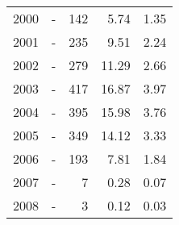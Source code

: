 \begin{longtable}{lXrrr}
        2000 & \multicolumn{1}{X}{-} & %
          \num{142} &
          \num[round-mode=places,round-precision=2]{5,74} &
          \num[round-mode=places,round-precision=2]{1,35} \\

        2001 & \multicolumn{1}{X}{-} & %
          \num{235} &
          \num[round-mode=places,round-precision=2]{9,51} &
          \num[round-mode=places,round-precision=2]{2,24} \\

        2002 & \multicolumn{1}{X}{-} & %
          \num{279} &
          \num[round-mode=places,round-precision=2]{11,29} &
          \num[round-mode=places,round-precision=2]{2,66} \\

        2003 & \multicolumn{1}{X}{-} & %
          \num{417} &
          \num[round-mode=places,round-precision=2]{16,87} &
          \num[round-mode=places,round-precision=2]{3,97} \\

        2004 & \multicolumn{1}{X}{-} & %
          \num{395} &
          \num[round-mode=places,round-precision=2]{15,98} &
          \num[round-mode=places,round-precision=2]{3,76} \\

        2005 & \multicolumn{1}{X}{-} & %
          \num{349} &
          \num[round-mode=places,round-precision=2]{14,12} &
          \num[round-mode=places,round-precision=2]{3,33} \\

        2006 & \multicolumn{1}{X}{-} & %
          \num{193} &
          \num[round-mode=places,round-precision=2]{7,81} &
          \num[round-mode=places,round-precision=2]{1,84} \\

        2007 & \multicolumn{1}{X}{-} & %
          \num{7} &
          \num[round-mode=places,round-precision=2]{0,28} &
          \num[round-mode=places,round-precision=2]{0,07} \\

        2008 & \multicolumn{1}{X}{-} & %
          \num{3} &
          \num[round-mode=places,round-precision=2]{0,12} &
          \num[round-mode=places,round-precision=2]{0,03} \\


\end{longtable}
